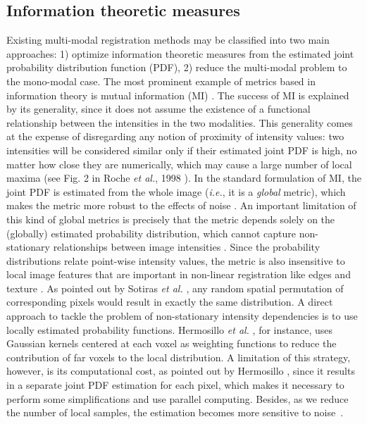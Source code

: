 \subsection{Information theoretic measures}
Existing multi-modal registration methods may be classified into two main approaches: 1) optimize information theoretic measures from the estimated joint probability distribution function (PDF), 2) reduce the multi-modal problem to the mono-modal case. The most prominent example of metrics based in information theory is mutual information (MI) \citep{Maes1997, Mattes2003}. The success of MI is explained by its generality, since it does not assume the existence of a functional relationship between the intensities in the two modalities. This generality comes at the expense of disregarding any notion of proximity of intensity values: two intensities will be considered similar only if their estimated joint PDF is high, no matter how close they are numerically, which may cause a large number of local maxima (see Fig. 2 in Roche {\it et al.}, 1998 \cite{Roche1998}). In the standard formulation of MI, the joint PDF is estimated from the whole image ({\it i.e.}, it is a {\it global} metric), which makes the metric more robust to the effects of noise \citep{Mattes2003}. An important limitation of this kind of global metrics is precisely that the metric depends solely on the (globally) estimated probability distribution, which cannot capture non-stationary relationships between image intensities \citep{Hermosillo2004}. Since the probability distributions relate point-wise intensity values, the metric is also insensitive to local image features that are important in non-linear registration like edges and texture \citep{Heinrich2012}. As pointed out by Sotiras {\it et al.} \cite{Sotiras2013}, any random spatial permutation of corresponding pixels would result in exactly the same distribution. A direct approach to tackle the problem of non-stationary intensity dependencies is to use locally estimated probability functions. Hermosillo {\it et al.} \cite{Hermosillo2004}, for instance, uses Gaussian kernels centered at each voxel as weighting functions to reduce the contribution of far voxels to the local distribution. A limitation of this strategy, however, is its computational cost, as pointed out by Hermosillo \cite{Hermosillo2004}, since it results in a separate joint PDF estimation for each pixel, which makes it necessary to perform some simplifications and use parallel computing. Besides, as we reduce the number of local samples, the estimation becomes more sensitive to noise~\citep{Mattes2003}.


